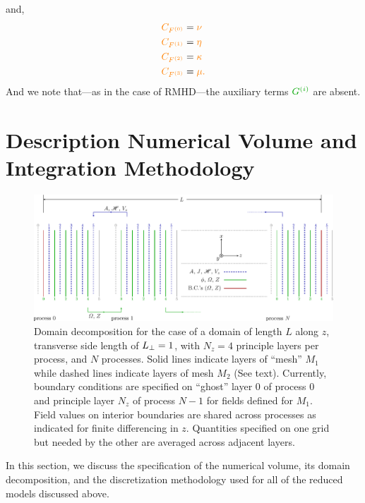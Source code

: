 \documentclass[12pt]{memoir}
\begin{document}
%
and,
%
\begin{subequations}
\begin{align}
  {\color{orange}C_{F^{(0)}}}     &= {\color{orange}\nu   } \label{eq:ffczero}    \\
  {\color{orange}C_{F^{(1)}}}     &= {\color{orange}\eta  } \label{eq:ffcone}     \\
  {\color{orange}C_{F^{(2)}}}     &= {\color{orange}\kappa} \label{eq:ffctwo}     \\
  {\color{orange}C_{F^{(3)}}}     &= {\color{orange}\mu.  } \label{eq:ffcthree}
\end{align}
\end{subequations}
%
And we note that---as in the case of RMHD---the auxiliary
terms ${\color{green!65!black}G^{(i)}}$ are absent.
%
\par
%
\section{Description Numerical Volume and Integration Methodology}
%
\begin{figure}[ht]
  \centering
  \includegraphics[scale=0.5]{figtwo.eps}
  \caption{Domain decomposition for the case of a domain of length
           $L$ along $z$, transverse side length of $L_\perp=1$, with 
           $N_z=4$ principle layers per process, and $N$ processes.  
           Solid lines indicate layers of ``mesh'' $M_1$ while dashed 
           lines indicate layers of mesh $M_2$ (See text). Currently, 
           boundary conditions are specified on ``ghost'' layer $0$ of 
           process $0$ and principle layer $N_z$ of process $N-1$ for 
           fields defined for $M_1$. Field values on interior boundaries 
           are shared across processes as indicated for finite 
           differencing in $z$. Quantities specified on one grid but 
           needed by the other are averaged across adjacent 
           layers. 
           \label{fig:figtwo}
}
\end{figure}
%
In this section, we discuss the specification of the numerical volume, its
domain decomposition, and the discretization methodology used for all of
the reduced models discussed above.
%
\end{document}
